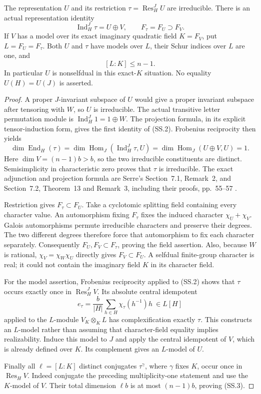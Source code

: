 \begin{proposition}[HD-SS01]
The representation $U$ and its restriction $\tau=\operatorname{Res}_H^J U$
are irreducible.  There is an actual representation identity
\[
 \operatorname{Ind}_H^J\tau=U\oplus V,
 \qquad F_\tau=F_U\supset F_V.
 \tag{SS.2}
\]
If $V$ has a model over its exact imaginary quadratic field $K=F_V$,
put $L=F_U=F_\tau$.  Both $U$ and $\tau$ have models over $L$, their
Schur indices over $L$ are one, and
\[
                         [L:K]\le n-1.
 \tag{SS.3}
\]
In particular $U$ is nonselfdual in this exact-$K$ situation.
No equality $U(H)=U(J)$ is asserted.
\end{proposition}

\begin{proof}
A proper $J$-invariant subspace of $U$ would give a proper invariant
subspace after tensoring with $W$, so $U$ is irreducible.
The actual transitive letter permutation module is
$\operatorname{Ind}_H^J1=1\oplus W$.
The projection formula, in its explicit tensor-induction form, gives
the first identity of (SS.2).  Frobenius reciprocity then yields
\[
 \dim\operatorname{End}_H(\tau)
   =\dim\operatorname{Hom}_J(\operatorname{Ind}_H^J\tau,U)
   =\dim\operatorname{Hom}_J(U\oplus V,U)=1.
 \tag{SS.4}
\]
Here $\dim V=(n-1)b>b$, so the two irreducible constituents are distinct.
Semisimplicity in characteristic zero proves that $\tau$ is
irreducible.  The exact adjunction and projection formula are
Serre's Section~7.1, Remark~2, and Section~7.2, Theorem~13 and
Remark~3, including their proofs, pp.~55--57
\cite{OG:Serre1977}.

Restriction gives $F_\tau\subset F_U$.  Take a cyclotomic splitting
field containing every character value.  An automorphism fixing
$F_\tau$ fixes the induced character $\chi_U+\chi_V$.
Galois automorphisms permute irreducible characters and preserve
their degrees.  The two different degrees therefore force that
automorphism to fix each character separately.  Consequently
$F_U,F_V\subset F_\tau$, proving the field assertion.  Also,
because $W$ is rational, $\chi_V=\chi_W\chi_U$ directly gives
$F_V\subset F_U$.  A selfdual finite-group character is real;
it could not contain the imaginary field $K$ in its character field.

For the model assertion, Frobenius reciprocity applied to (SS.2)
shows that $\tau$ occurs exactly once in $\operatorname{Res}_H^J V$.
Its absolute central idempotent
\[
 e_\tau=\frac{b}{|H|}\sum_{h\in H}\chi_\tau(h^{-1})h
                 \ \in L[H]
 \tag{SS.5}
\]
applied to the $L$-module $V_K\otimes_KL$ has complexification
exactly $\tau$.  This constructs an $L$-model rather than assuming
that character-field equality implies realizability.
Induce this model to $J$ and apply the central idempotent of $V$,
which is already defined over $K$.  Its complement gives an
$L$-model of $U$.

Finally all $\ell=[L:K]$ distinct conjugates $\tau^\gamma$, where
$\gamma$ fixes $K$, occur once in $\operatorname{Res}_H V$.
Indeed conjugate the preceding multiplicity-one statement and use
the $K$-model of $V$.  Their total dimension $\ell b$ is at most
$(n-1)b$, proving (SS.3).
\end{proof}

